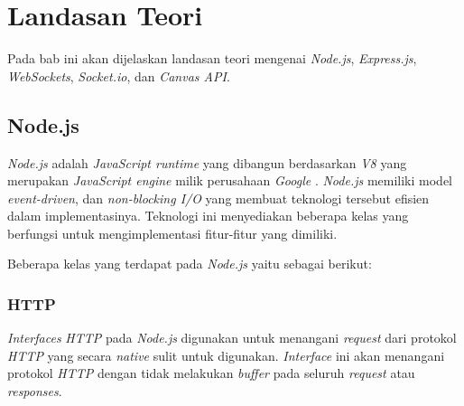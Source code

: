 \chapter{Landasan Teori}
\label{chap:teori}

Pada bab ini akan dijelaskan landasan teori mengenai \textit{Node.js}, \textit{Express.js}, \textit{WebSockets}, \textit{Socket.io}, dan \textit{Canvas API}.

\section{Node.js}


\label{sec:Node.js}

\textit{Node.js} adalah \textit{JavaScript runtime} yang dibangun berdasarkan \textit{V8} yang merupakan \textit{JavaScript engine} milik perusahaan \textit{Google} \cite{nodejs}. \textit{Node.js} memiliki model \textit{event-driven}, dan \textit{non-blocking I/O} yang membuat teknologi tersebut efisien dalam implementasinya. Teknologi ini menyediakan beberapa kelas yang berfungsi untuk mengimplementasi fitur-fitur yang dimiliki.

Beberapa kelas yang terdapat pada \textit{Node.js} yaitu sebagai berikut: 

\subsection{HTTP}
\textit{Interfaces} \textit{HTTP} pada \textit{Node.js} digunakan untuk menangani \textit{request} dari protokol \textit{HTTP} yang secara \textit{native} sulit untuk digunakan. \textit{Interface} ini akan menangani protokol \textit{HTTP} dengan tidak melakukan \textit{buffer} pada seluruh \textit{request} atau \textit{responses}.


